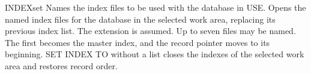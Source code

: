 \begin{XbaseEntry}{INDEX}{set}
Names the index files to be used with the database in USE.
\Syntax
{}
\Usage
Opens the named index files for the database in the selected work area,
replacing its previous index list.  The extension  is assumed.
Up to seven files may be named.  The first becomes the master index, and
the record pointer moves to its beginning.  SET INDEX TO without a list
closes the indexes of the selected work area and restores record order.
\Examples
{}
\end{XbaseEntry}

